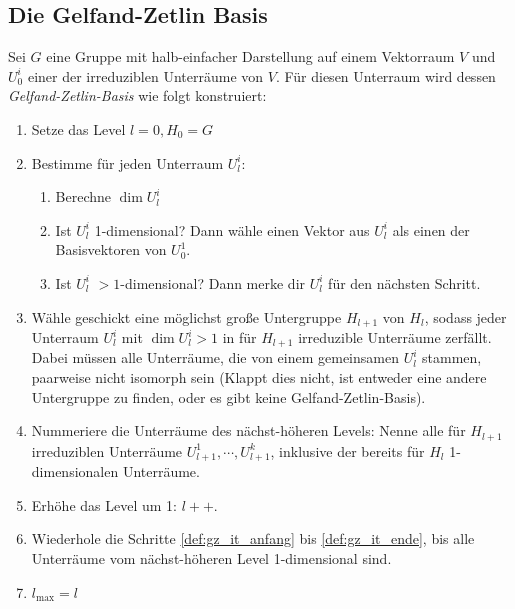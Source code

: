  \subsection{Die Gelfand-Zetlin Basis}
 \begin{definition}
 	\label{def:konstruktion_gz_basis}
	Sei $G$ eine Gruppe mit halb-einfacher Darstellung auf einem Vektorraum $V$ und $U^i_0$ einer der irreduziblen Unterräume von $V$. Für diesen Unterraum wird dessen \emph{Gelfand-Zetlin-Basis} wie folgt konstruiert:
	\begin{enumerate}[label={\arabic*.)}]
		\item Setze das Level $l=0, H_0 = G$
		\item Bestimme für jeden Unterraum $U_l^i$: \label{def:gz_it_anfang}
		\begin{enumerate}
			\item Berechne $\dim{U_l^i}$
			\item Ist $U_l^i$ 1-dimensional? Dann wähle einen Vektor aus $U_l^i$ als einen der Basisvektoren von $U^1_0$.
			\item Ist $U_l^i$ $>1$-dimensional? Dann merke dir $U_l^i$ für den nächsten Schritt.
		\end{enumerate}
		\item Wähle geschickt eine möglichst große Untergruppe $H_{l+1}$ von $H_{l}$, sodass jeder Unterraum $U_l^i$ mit $\dim{U_l^i}>1$ in für $H_{l+1}$ irreduzible Unterräume  zerfällt. Dabei müssen alle Unterräume, die von einem gemeinsamen $U_l^i$ stammen, paarweise nicht isomorph sein (Klappt dies nicht, ist entweder eine andere Untergruppe zu finden, oder es gibt keine Gelfand-Zetlin-Basis). \label{def:gz_it_ugschritt}
		\item Nummeriere die Unterräume des nächst-höheren Levels: Nenne alle für $H_{l+1}$ irreduziblen Unterräume $U_{l+1}^{1}, \cdots, U_{l+1}^{k}$, inklusive der bereits für $H_l$ 1-dimensionalen Unterräume.
		\item Erhöhe das Level um 1: $l++$. \label{def:gz_it_ende}
		\item Wiederhole die Schritte \ref{def:gz_it_anfang} bis \ref{def:gz_it_ende}, bis alle Unterräume vom nächst-höheren Level 1-dimensional sind.
		\item $l_{\text{max}} = l$
		\end{enumerate}
\end{definition}
